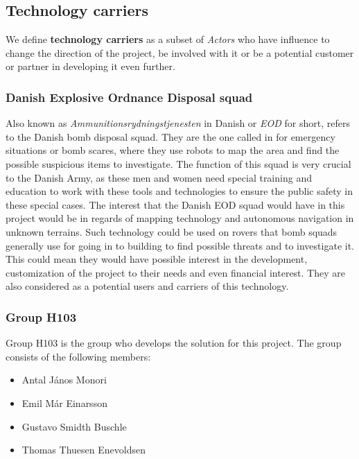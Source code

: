 \subsection{Technology carriers}
We define \textbf{technology carriers} as a subset of \textit{Actors} who have influence to change the direction of the project, be involved with it or be a potential customer or partner in developing it even further.

\subsubsection{Danish Explosive Ordnance Disposal squad} 
Also known as \textit{Ammunitionsrydningstjenesten} in Danish or \textit{EOD} for short, refers to the Danish bomb disposal squad\cite{EOD}. They are the one called in for emergency situations or bomb scares, where they use robots to map the area and find the possible suspicious items to investigate. The function of this squad is very crucial to the Danish Army, as these men and women need special training and education to work with these tools and technologies to ensure the public safety in these special cases. The interest that the Danish EOD squad would have in this project would be in regards of mapping technology and autonomous navigation in unknown terrains. Such technology could be used on rovers that bomb squads generally use for going in to building to find possible threats and to investigate it. This could mean they would have possible interest in the development, customization of the project to their needs and even financial interest. They are also considered as a potential users and carriers of this technology.

\subsubsection{Group H103}	
Group H103 is the group who develops the solution for this project. The group consists of the following members:
\begin{itemize}
	\item Antal János Monori
	\item Emil Már Einarsson
	\item Gustavo Smidth Buschle
	\item Thomas Thuesen Enevoldsen
\end{itemize}

